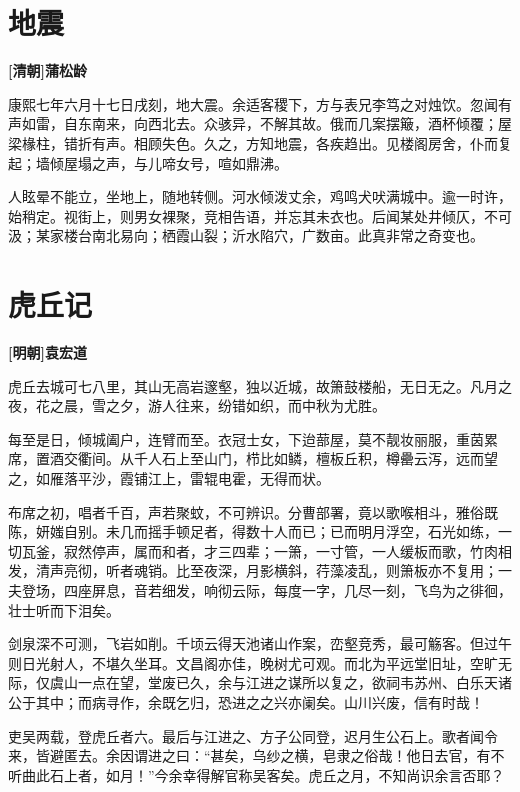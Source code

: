 \documentclass[UTF8,titlepage,oneside]{ctexbook}
\begin{document}
\chapter*{地震}
\begin{center}
	\textbf{[清朝]蒲松龄}
\end{center}


康熙七年六月十七日戌刻，地大震。余适客稷下，方与表兄李笃之对烛饮。忽闻有声如雷，自东南来，向西北去。众骇异，不解其故。俄而几案摆簸，酒杯倾覆；屋梁椽柱，错折有声。相顾失色。久之，方知地震，各疾趋出。见楼阁房舍，仆而复起；墙倾屋塌之声，与儿啼女号，喧如鼎沸。


人眩晕不能立，坐地上，随地转侧。河水倾泼丈余，鸡鸣犬吠满城中。逾一时许，始稍定。视街上，则男女裸聚，竞相告语，并忘其未衣也。后闻某处井倾仄，不可汲；某家楼台南北易向；栖霞山裂；沂水陷穴，广数亩。此真非常之奇变也。



\chapter*{虎丘记}
\begin{center}
	\textbf{[明朝]袁宏道}
\end{center}


虎丘去城可七八里，其山无高岩邃壑，独以近城，故箫鼓楼船，无日无之。凡月之夜，花之晨，雪之夕，游人往来，纷错如织，而中秋为尤胜。


每至是日，倾城阖户，连臂而至。衣冠士女，下迨蔀屋，莫不靓妆丽服，重茵累席，置酒交衢间。从千人石上至山门，栉比如鳞，檀板丘积，樽罍云泻，远而望之，如雁落平沙，霞铺江上，雷辊电霍，无得而状。


布席之初，唱者千百，声若聚蚊，不可辨识。分曹部署，竟以歌喉相斗，雅俗既陈，妍媸自别。未几而摇手顿足者，得数十人而已；已而明月浮空，石光如练，一切瓦釜，寂然停声，属而和者，才三四辈；一箫，一寸管，一人缓板而歌，竹肉相发，清声亮彻，听者魂销。比至夜深，月影横斜，荇藻凌乱，则箫板亦不复用；一夫登场，四座屏息，音若细发，响彻云际，每度一字，几尽一刻，飞鸟为之徘徊，壮士听而下泪矣。


剑泉深不可测，飞岩如削。千顷云得天池诸山作案，峦壑竞秀，最可觞客。但过午则日光射人，不堪久坐耳。文昌阁亦佳，晚树尤可观。而北为平远堂旧址，空旷无际，仅虞山一点在望，堂废已久，余与江进之谋所以复之，欲祠韦苏州、白乐天诸公于其中；而病寻作，余既乞归，恐进之之兴亦阑矣。山川兴废，信有时哉！


吏吴两载，登虎丘者六。最后与江进之、方子公同登，迟月生公石上。歌者闻令来，皆避匿去。余因谓进之曰：“甚矣，乌纱之横，皂隶之俗哉！他日去官，有不听曲此石上者，如月！”今余幸得解官称吴客矣。虎丘之月，不知尚识余言否耶？ 
\end{document}
